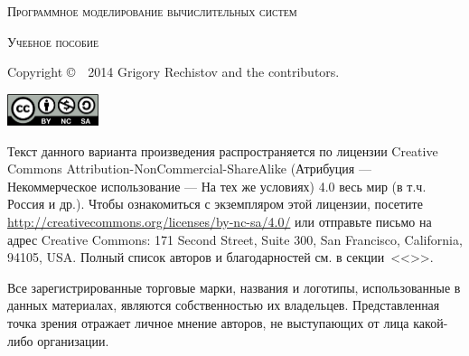 
\thispagestyle{empty}


\begin{center}
    \Huge\textsc{Программное моделирование вычислительных систем}\par
\end{center}

\vspace{0.5cm}

\begin{center}
	\Large\textsc{Учебное пособие}\par
\end{center}


\newlength{\centeroffset}
\setlength{\centeroffset}{-0.5\oddsidemargin}
\addtolength{\centeroffset}{0.5\evensidemargin}
\noindent\hspace*{\centeroffset}

\pagebreak
\thispagestyle{empty}

\begin{small} 
Copyright \copyright~~2014 Grigory Rechistov and the contributors. %
\begin{center}
    \includegraphics[width=0.2\textwidth]{cc-by-nc-sa.png}
\end{center}

Текст данного варианта произведения распространяется по лицензии Creative Commons At\-tri\-bu\-tion-Non\-Com\-mer\-cial-Share\-Alike (Атрибуция — Некоммерческое использование — На тех же условиях) 4.0 весь мир (в т.ч. Россия и др.). Чтобы ознакомиться с экземпляром этой лицензии, посетите \url{http://creativecommons.org/licenses/by-nc-sa/4.0/} или отправьте письмо на адрес Creative Commons: 171 Second Street, Suite 300, San Francisco, California, 94105, USA. 
Полный список авторов и благодарностей см. в секции~<<>>.

Все зарегистрированные торговые марки, названия и логотипы, использованные в данных материалах, являются собственностью их владельцев. Представленная точка зрения отражает личное мнение авторов, не выступающих от лица какой-либо организации.
\end{small}

